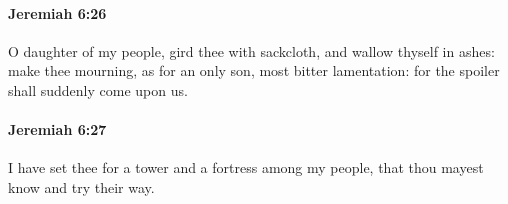 		\paragraph{Jeremiah 6:26} %
			\label{JEREMIAH-6-26}

			O daughter of my people, gird thee with sackcloth, and wallow thyself in ashes: make thee mourning, as for an only son, most bitter lamentation: for the spoiler shall suddenly come upon us.


		\paragraph{Jeremiah 6:27} %
			\label{JEREMIAH-6-27}

			I have set thee for a tower and a fortress among my people, that thou mayest know and try their way.


